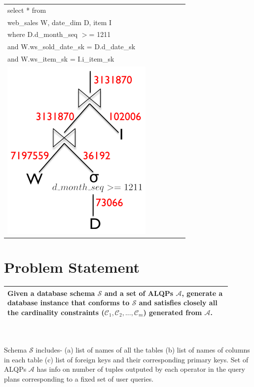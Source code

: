 \documentclass[]{article}
\newenvironment{Figure}
  {\par\medskip\noindent\minipage{\linewidth}}
  {\endminipage\par\medskip}
\begin{document}
\begin{multicols}{2}
		{
		\begin{tabular}{ |p{0.8\linewidth}| }
			\hline
			select * from \\ 
			web\_sales W, date\_dim D, item I \\ 
			where D.d\_month\_seq $>$= 1211 \\ 
			and W.ws\_sold\_date\_sk = D.d\_date\_sk \\ 
			and W.ws\_item\_sk = I.i\_item\_sk \\
			\hline
			\begin{Figure}
				\centering
				\includegraphics[width=0.8\linewidth]{figures/alqp1.png}
				\label{fig:alqp1}
			\end{Figure} \\
			\hline
		\end{tabular}
		}
		
	\section{Problem Statement}
			\begin{tabular}{ |p{0.9\linewidth}| }
			\hline
				Given a database schema $\mathcal{S}$ and a set of ALQPs  $\mathcal{A}$, generate a database instance that conforms to $\mathcal{S}$ and satisfies closely all the cardinality constraints ($\mathcal{C}_1, \mathcal{C}_2, ... , \mathcal{C}_m$) generated from $\mathcal{A}$. \\
			\hline
			\end{tabular}
			\\ \\ 
		Schema $\mathcal{S}$ includes- (a) list of names of all the tables (b) list of names of columns in each table (c) list of foreign keys and their corresponding primary keys. 
		Set of ALQPs $\mathcal{A}$ has info on number of tuples outputed by each operator in the query plans corresponding to a fixed set of user queries. 


\end{multicols}
\end{document}
